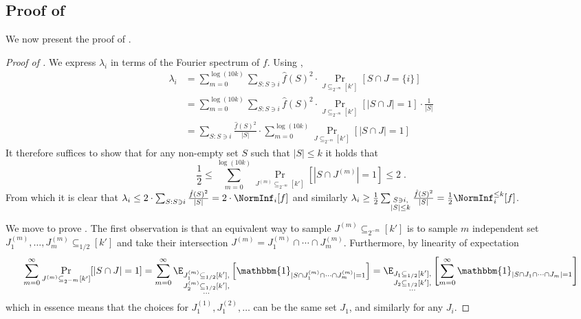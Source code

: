 \subsection{Proof of }
\label{subsection:proof-of-ninf-ub-lb}
We now present the proof of .
\begin{proof}[Proof of ]
We express $\lambda_i$ in terms of the Fourier spectrum of $f$. Using ,
\begin{align*}\lambda_i &= \sum_{m=0}^{\log(10k)} \sum_{S: S \ni i} \hat{f}(S)^2 \cdot \Pr_{J \subseteq_{2^{-m}} [{k'}]}[ S \cap J = \{i\}]
\\ &= \sum_{m=0}^{\log(10k)} \sum_{S: S \ni i} \hat{f}(S)^2 \cdot \Pr_{J \subseteq_{2^{-m}} [{k'}]}[ |S \cap J| = 1] \cdot \frac{1}{|S|}
\\&=\sum_{S: S \ni i} \frac{\hat{f}(S)^2}{|S|} \cdot \sum_{m=0}^{\log(10k)} \Pr_{J \subseteq_{2^{-m}} [{k'}]}[ |S \cap J| = 1]\end{align*}
It therefore suffices to show that for any non-empty set $S$ such that $|S| \leq k$ it holds that
\begin{equation}\label{eq:1}
\frac{1}{2} \le \sum_{m=0}^{\log(10k)} \Pr_{J^{(m)} \subseteq_{2^{-m}} [{k'}]}[ |S \cap J^{(m)}| = 1] \le 2\;.
\end{equation}
From which it is clear that $\lambda_i \le 2 \cdot \sum_{S: S \ni i} \frac{\hat{f}(S)^2}{|S|}  = 2 \cdot \NormInf_i[f]$ and similarly $\lambda_i \ge \frac{1}{2}\sum_{\substack{ S \ni i,\\ |S|\le k}} \frac{\hat{f}(S)^2}{|S|}  =   \frac{1}{2}\NormInf_i^{\leq k}[f]$.

We move to prove .
The first observation is that an equivalent way to sample $J^{(m)} \subseteq_{2^{-m}}[{k'}]$ is to sample $m$ independent set $J^{(m)}_1, \ldots, J^{(m)}_{m} \subseteq_{1/2}[{k'}]$ and take their intersection $J^{(m)} = J^{(m)}_1 \cap \cdots \cap J^{(m)}_{m}$. Furthermore,  by linearity of expectation
$$\sum_{m=0}^{\infty} \Pr_{J^{(m)} \subseteq_{2^{-m}} [{k'}]}[ |S \cap J| = 1]
= \sum_{m=0}^{\infty}\E_{\substack{J_1^{(m)} \subseteq_{1/2}[{k'}], \\J_2^{(m)} \subseteq_{1/2}[{k'}], \\ \ldots}} \left [ \mathbbm{1}_{|S \cap J_1^{(m)}  \cap \cdots \cap J_m^{(m)}| = 1}\right ]
=\E_{\substack{J_1 \subseteq_{1/2}[{k'}], \\J_2 \subseteq_{1/2}[{k'}], \\\ldots}}\left[ \sum_{m=0}^{\infty} \mathbbm{1}_{|S \cap J_1 \cap \cdots \cap J_m| = 1}\right]$$
which in essence means that the choices for $J_1^{(1)}, J_1^{(2)}, \ldots$ can be the same set $J_1$, and similarly for any $J_i$.



\end{proof}
